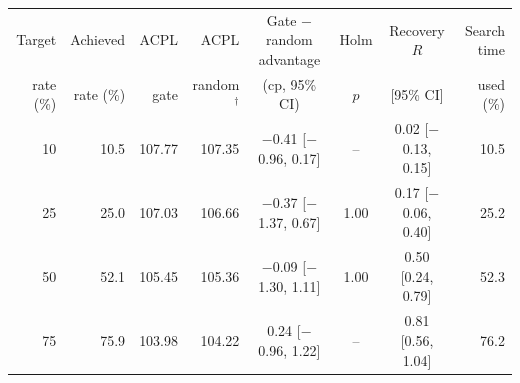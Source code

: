 \begin{tabular}{rrrrcccr}
\toprule
Target & Achieved & ACPL & ACPL & Gate $-$ random advantage & Holm & Recovery $R$ & Search time \\
rate (\%) & rate (\%) & gate & random$^{\dagger}$ & (cp, 95\% CI) & $p$ & [95\% CI] & used (\%) \\
\midrule
10 & 10.5 & 107.77 & 107.35 & \ensuremath{-}0.41 [\ensuremath{-}0.96, 0.17] & -- & 0.02 [\ensuremath{-}0.13, 0.15] & 10.5 \\
25 & 25.0 & 107.03 & 106.66 & \ensuremath{-}0.37 [\ensuremath{-}1.37, 0.67] & 1.00 & 0.17 [\ensuremath{-}0.06, 0.40] & 25.2 \\
50 & 52.1 & 105.45 & 105.36 & \ensuremath{-}0.09 [\ensuremath{-}1.30, 1.11] & 1.00 & 0.50 [0.24, 0.79] & 52.3 \\
75 & 75.9 & 103.98 & 104.22 & 0.24 [\ensuremath{-}0.96, 1.22] & -- & 0.81 [0.56, 1.04] & 76.2 \\
\bottomrule
\end{tabular}
